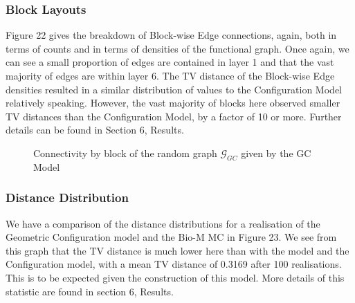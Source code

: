 \subsubsection{Block Layouts}
Figure 22 gives the breakdown of Block-wise Edge connections, again, both in terms of counts and in terms of densities of the functional graph. Once again, we can see a small proportion of edges are contained in layer 1 and that the vast majority of edges are within layer 6. The TV distance of the Block-wise Edge densities resulted in a similar distribution of values to the Configuration Model relatively speaking. However, the vast majority of blocks here observed smaller TV distances than the Configuration Model, by a factor of 10 or more. Further details can be found in Section 6, Results.

\begin{figure}[H]%
    \centering
    \captionsetup{justification=centering}
    \qquad
    \caption{Connectivity by block of the random graph $\mathcal{G}_{GC}$ given by the GC Model}%
    \label{fig:example}%
\end{figure}
\subsubsection{Distance Distribution}
We have a comparison of the distance distributions for a realisation of the Geometric Configuration model and the Bio-M MC in Figure 23. We see from this graph that the TV distance is much lower here than with the \ER model and the Configuration model, with a mean TV distance of 0.3169 after 100 realisations. This is to be expected given the construction of this model. More details of this statistic are found in section 6, Results.



